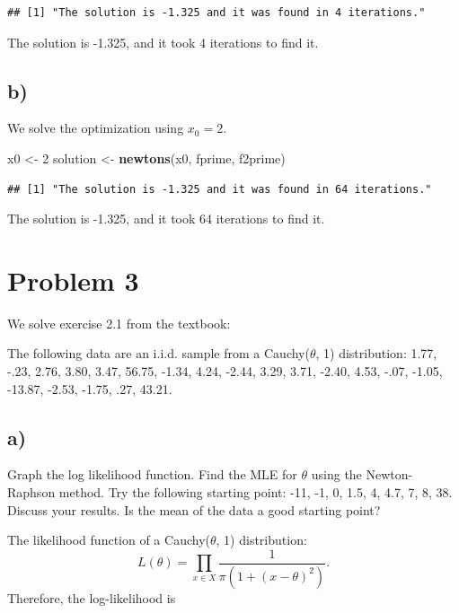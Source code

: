 \documentclass[]{article}
\newenvironment{Shaded}{\begin{snugshade}}{\end{snugshade}}
\newcommand{\KeywordTok}[1]{\textcolor[rgb]{0.13,0.29,0.53}{\textbf{{#1}}}}
\newcommand{\DecValTok}[1]{\textcolor[rgb]{0.00,0.00,0.81}{{#1}}}
\newcommand{\StringTok}[1]{\textcolor[rgb]{0.31,0.60,0.02}{{#1}}}
\newcommand{\NormalTok}[1]{{#1}}
\begin{document}
\begin{verbatim}
## [1] "The solution is -1.325 and it was found in 4 iterations."
\end{verbatim}

The solution is -1.325, and it took 4 iterations to find it.

\subsection{b)}\label{b-1}

We solve the optimization using \(x_0=2\).

\begin{Shaded}
\begin{Highlighting}[]
\NormalTok{x0 <-}\StringTok{ }\DecValTok{2}
\NormalTok{solution <-}\StringTok{ }\KeywordTok{newtons}\NormalTok{(x0, fprime, f2prime)}
\end{Highlighting}
\end{Shaded}

\begin{verbatim}
## [1] "The solution is -1.325 and it was found in 64 iterations."
\end{verbatim}

The solution is -1.325, and it took 64 iterations to find it.

\section{Problem 3}\label{problem-3}

We solve exercise 2.1 from the textbook:

The following data are an i.i.d. sample from a Cauchy(\(\theta\), 1)
distribution: 1.77, -.23, 2.76, 3.80, 3.47, 56.75, -1.34, 4.24, -2.44,
3.29, 3.71, -2.40, 4.53, -.07, -1.05, -13.87, -2.53, -1.75, .27, 43.21.

\subsection{a)}\label{a-2}

Graph the log likelihood function. Find the MLE for \(\theta\) using the
Newton-Raphson method. Try the following starting point: -11, -1, 0,
1.5, 4, 4.7, 7, 8, 38. Discuss your results. Is the mean of the data a
good starting point?

The likelihood function of a Cauchy(\(\theta\), 1) distribution: \[
L(\theta) = \prod_{x \in X} \frac{1}
{\pi(1 + (x - \theta) ^ 2)}.
\] Therefore, the log-likelihood is
\end{document}

